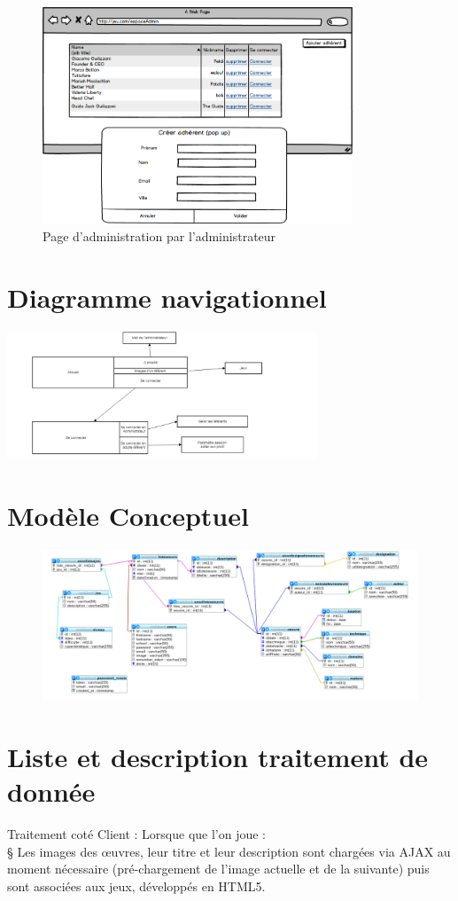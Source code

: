 \documentclass[12pt,a4paper]{report}
\begin{document}
\begin{figure}
	\includegraphics[width=350px]{../Maquette/espaceAdmin.png}
	\caption{Page d'administration par l'administrateur}
\end{figure}


\chapter{ Diagramme navigationnel}
\includegraphics[width=350px]{../../UML/diagramme_navigationnel.jpg}\\

\chapter{Modèle Conceptuel}
\begin{figure}
\includegraphics[width=450px]{../../UML/diagramClass2.png}\\
\end{figure}

\chapter{Liste et description traitement de donnée}
Traitement coté Client : 
Lorsque que l’on joue :\\
§  Les images des œuvres, leur titre et leur description sont chargées via AJAX au moment nécessaire (pré-chargement de l’image actuelle et de la suivante) puis sont associées aux jeux, développés en HTML5.
 
\end{document}
